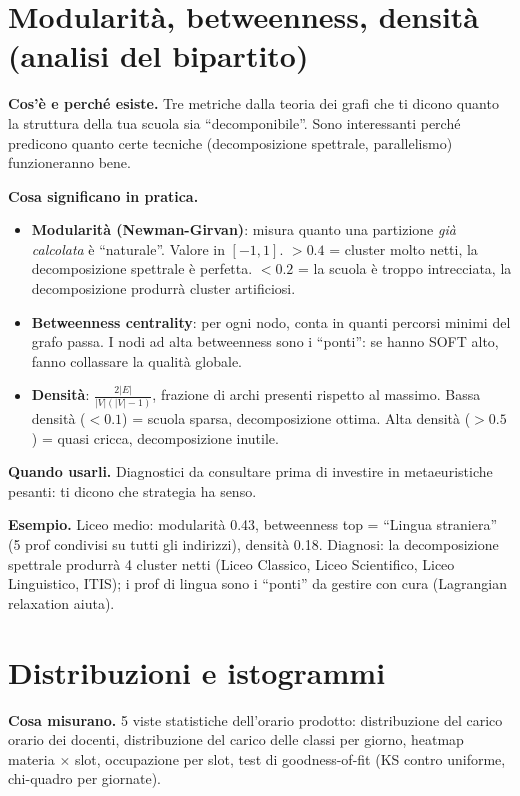 \section{Modularit\`a, betweenness, densit\`a (analisi del bipartito)}

\textbf{Cos'\`e e perch\'e esiste.} Tre metriche dalla teoria
dei grafi che ti dicono quanto la struttura della tua scuola
sia ``decomponibile''. Sono interessanti perch\'e predicono
quanto certe tecniche (decomposizione spettrale, parallelismo)
funzioneranno bene.

\textbf{Cosa significano in pratica.}
\begin{itemize}
\item \textbf{Modularit\`a (Newman-Girvan)}: misura quanto
  una partizione \emph{gi\`a calcolata} \`e ``naturale''.
  Valore in $[-1, 1]$. $> 0.4$ = cluster molto netti, la
  decomposizione spettrale \`e perfetta. $< 0.2$ = la scuola
  \`e troppo intrecciata, la decomposizione produrr\`a
  cluster artificiosi.
\item \textbf{Betweenness centrality}: per ogni nodo, conta
  in quanti percorsi minimi del grafo passa. I nodi ad alta
  betweenness sono i ``ponti'': se hanno SOFT alto, fanno
  collassare la qualit\`a globale.
\item \textbf{Densit\`a}: $\frac{2 |E|}{|V|(|V|-1)}$, frazione
  di archi presenti rispetto al massimo. Bassa densit\`a
  ($< 0.1$) = scuola sparsa, decomposizione ottima. Alta
  densit\`a ($> 0.5$) = quasi cricca, decomposizione
  inutile.
\end{itemize}

\textbf{Quando usarli.} Diagnostici da consultare prima di
investire in metaeuristiche pesanti: ti dicono che strategia
ha senso.

\textbf{Esempio.} Liceo medio: modularit\`a 0.43, betweenness
top = ``Lingua straniera'' (5 prof condivisi su tutti gli
indirizzi), densit\`a 0.18. Diagnosi: la decomposizione
spettrale produrr\`a 4 cluster netti (Liceo Classico, Liceo
Scientifico, Liceo Linguistico, ITIS); i prof di lingua sono
i ``ponti'' da gestire con cura (Lagrangian relaxation aiuta).

\section{Distribuzioni e istogrammi}

\textbf{Cosa misurano.} 5 viste statistiche dell'orario
prodotto: distribuzione del carico orario dei docenti,
distribuzione del carico delle classi per giorno, heatmap
materia $\times$ slot, occupazione per slot, test di
goodness-of-fit (KS contro uniforme, chi-quadro per
giornate).

